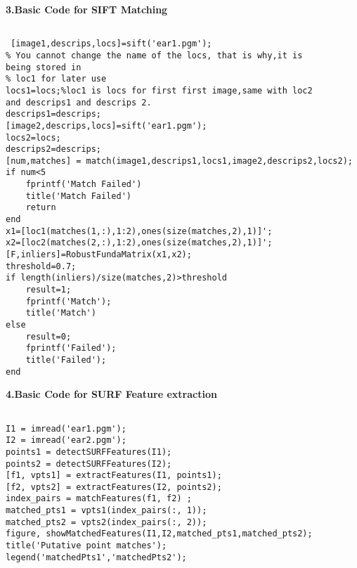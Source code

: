 \textbf{3.Basic Code for SIFT Matching }
\begin{lstlisting}

 [image1,descrips,locs]=sift('ear1.pgm');
% You cannot change the name of the locs, that is why,it is 
being stored in
% loc1 for later use
locs1=locs;%loc1 is locs for first first image,same with loc2
and descrips1 and descrips 2.
descrips1=descrips;
[image2,descrips,locs]=sift('ear1.pgm');
locs2=locs;
descrips2=descrips;
[num,matches] = match(image1,descrips1,locs1,image2,descrips2,locs2);
if num<5
    fprintf('Match Failed')
    title('Match Failed')
    return
end
x1=[loc1(matches(1,:),1:2),ones(size(matches,2),1)]';
x2=[loc2(matches(2,:),1:2),ones(size(matches,2),1)]';
[F,inliers]=RobustFundaMatrix(x1,x2);
threshold=0.7;
if length(inliers)/size(matches,2)>threshold
    result=1;
    fprintf('Match');
    title('Match')
else
    result=0;
    fprintf('Failed');
    title('Failed');
end

\end{lstlisting}

\textbf{4.Basic Code for SURF Feature extraction}
\begin{lstlisting}

I1 = imread('ear1.pgm');
I2 = imread('ear2.pgm');
points1 = detectSURFFeatures(I1);
points2 = detectSURFFeatures(I2);
[f1, vpts1] = extractFeatures(I1, points1);
[f2, vpts2] = extractFeatures(I2, points2);
index_pairs = matchFeatures(f1, f2) ;
matched_pts1 = vpts1(index_pairs(:, 1));
matched_pts2 = vpts2(index_pairs(:, 2));
figure, showMatchedFeatures(I1,I2,matched_pts1,matched_pts2);
title('Putative point matches');
legend('matchedPts1','matchedPts2');

\end{lstlisting}